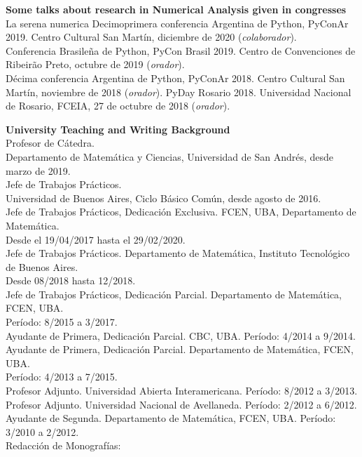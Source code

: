 \textbf{Some talks about research in Numerical Analysis given in congresses}\\[6pt]
La serena numerica
Decimoprimera conferencia Argentina de Python, PyConAr 2019. Centro Cultural San Mart\'in,
diciembre de 2020 (\emph{colaborador}).\\[4pt]
Conferencia Brasile\~na de Python, PyCon Brasil 2019. Centro de Convenciones de
Ribeir\~ao Preto, octubre de 2019 (\emph{orador}).\\[4pt]
D\'ecima conferencia Argentina de Python, PyConAr 2018.
Centro Cultural San Mart\'in, noviembre de 2018 (\emph{orador}).
PyDay Rosario 2018. Universidad Nacional de Rosario, FCEIA, 27 de octubre
de 2018 (\emph{orador}).

\textbf{University Teaching and Writing Background}\\[6pt]
Profesor de C\'atedra.\\
Departamento de Matem\'atica y Ciencias, 
Universidad de San Andr\'es, desde marzo de 2019.\\[4pt]
Jefe de Trabajos Pr\'acticos.\\Universidad de Buenos Aires,
Ciclo B\'asico Com\'un, desde agosto de 2016.\\[4pt]
Jefe de Trabajos Pr\'acticos, Dedicaci\'on Exclusiva. FCEN, UBA, 
Departamento de Matem\'atica.\\Desde el 19/04/2017 hasta el 29/02/2020.\\[4pt]
Jefe de Trabajos Pr\'acticos. Departamento de Matem\'atica, 
Instituto Tecnol\'ogico de Buenos Aires.\\Desde 08/2018 hasta 12/2018.\\[4pt]
Jefe de Trabajos Pr\'acticos, Dedicaci\'on Parcial. Departamento de Matem\'atica, FCEN, UBA.\\
Per\'iodo: 8/2015 a 3/2017.\\[4pt]
Ayudante de Primera, Dedicaci\'on Parcial. CBC, UBA. Per\'iodo: 4/2014 a 9/2014.\\[4pt]
Ayudante de Primera, Dedicaci\'on Parcial. Departamento de Matem\'atica, FCEN, UBA.\\
Per\'iodo: 4/2013 a 7/2015.\\[4pt]
Profesor Adjunto. Universidad Abierta Interamericana.
Per\'iodo: 8/2012 a 3/2013.\\[4pt]
Profesor Adjunto. Universidad Nacional de Avellaneda.
Per\'iodo: 2/2012 a 6/2012.\\[4pt]
Ayudante de Segunda. Departamento de Matem\'atica, FCEN, UBA. Per\'iodo: 3/2010 a 2/2012.\\[6pt]
Redacci\'on de Monograf\'ias:\\[6pt]
